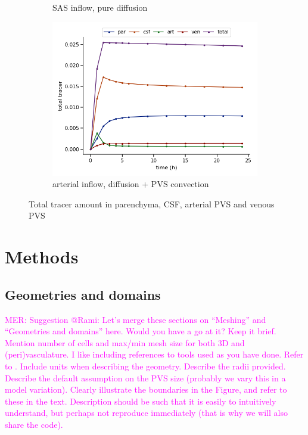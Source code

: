 \documentclass[fleqn,10pt]{wlscirep}
\newcommand{\mer}[1]{\textcolor{magenta}{#1}}
\begin{document}
\begin{figure}
\begin{subfigure}[b]{0.33\textwidth}
         \caption{SAS inflow, pure diffusion}
         \label{fig:three sin x}
     \end{subfigure}
     \hfill
     \begin{subfigure}[b]{0.33\textwidth}
         \centering
         \includegraphics[width=\textwidth]{modelC_total_conc.png}
         \caption{arterial inflow, diffusion + PVS convection}
         \label{fig:five over x}
     \end{subfigure}
        \caption{Total tracer amount in parenchyma, CSF, arterial PVS and venous PVS}
        \label{fig:three graphs}
\end{figure}

\fi

\newpage
\section*{Methods}


\subsection*{Geometries and domains}

\mer{MER: Suggestion @Rami: Let's merge these sections on ``Meshing'' and ``Geometries and domains'' here. Would you have a go at it? Keep it brief. Mention number of cells and max/min mesh size for both 3D and (peri)vasculature. I like including references to tools used as you have done. Refer to \Cref{fig:concept}. Include units when describing the geometry. Describe the radii provided. Describe the default assumption on the PVS size (probably we vary this in a model variation). Clearly illustrate the boundaries in the Figure, and refer to these in the text. Description should be such that it is easily to intuitively understand, but perhaps not reproduce immediately (that is why we will also share the code). }  
\end{document}

